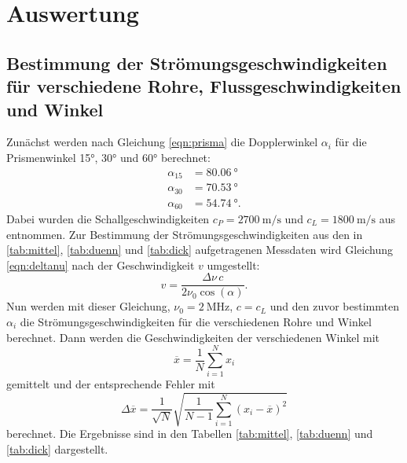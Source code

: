 \section{Auswertung}
\label{sec:Auswertung}
\subsection{Bestimmung der Strömungsgeschwindigkeiten für verschiedene Rohre, Flussgeschwindigkeiten und Winkel}
Zunächst werden nach Gleichung \eqref{eqn:prisma} die Dopplerwinkel $\alpha_i$ für die Prismenwinkel 15°, 30° und 60° berechnet:
\begin{align*}
  \alpha_{15} &= \SI{80.06}{\degree} \\
  \alpha_{30} &= \SI{70.53}{\degree} \\
  \alpha_{60} &= \SI{54.74}{\degree} .
\end{align*}
Dabei wurden die Schallgeschwindigkeiten $c_P=\SI{2700}{\metre\per\second}$ und $c_L=\SI{1800}{\metre\per\second}$ aus \cite{sample} entnommen.
Zur Bestimmung der Strömungsgeschwindigkeiten aus den in \ref{tab:mittel}, \ref{tab:duenn} und \ref{tab:dick} aufgetragenen Messdaten wird
Gleichung \eqref{eqn:deltanu} nach der Geschwindigkeit $v$ umgestellt:
\begin{equation}
  v=\frac{\Delta\nu\,c}{2 \nu_0 \cos(\alpha)} .
  \label{eqn:geschwindigkeit}
\end{equation}
Nun werden mit dieser Gleichung, $\nu_0=\SI{2}{\mega\hertz}$, $c=c_L$ und den zuvor bestimmten $\alpha_i$ die Strömungsgeschwindigkeiten für die verschiedenen Rohre
und Winkel berechnet. Dann werden die Geschwindigkeiten der verschiedenen Winkel mit
\begin{equation}
  \label{eqn:mittelwert}
  \overline{x} = \frac{1}{N} \sum_{i=1}^N x_i
\end{equation}
gemittelt und der entsprechende Fehler mit
\begin{equation}
  \label{eqn:mittelwertfehler}
  \Delta \overline{x} = \frac{1}{\sqrt{N}} \sqrt{\frac{1}{N-1} \sum_{i=1}^N (x_i - \overline{x})^2}
\end{equation}
berechnet. Die Ergebnisse sind in den Tabellen \ref{tab:mittel}, \ref{tab:duenn} und \ref{tab:dick} dargestellt.

